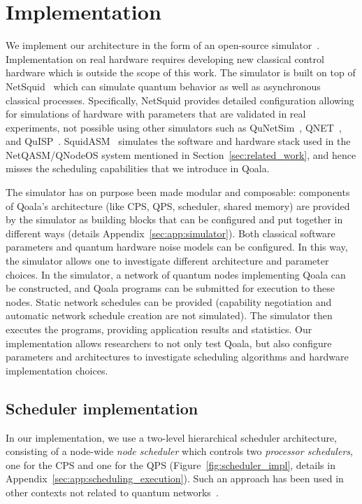 \section{Implementation}
\label{sec:implementation}
We implement our architecture in the form of an open-source simulator~\cite{qoala2023simulator}.
Implementation on real hardware requires developing new classical control hardware which is outside the scope of this work.
The simulator is built on top of NetSquid~\cite{coopmans2021netsquid} which can simulate quantum behavior as well as asynchronous classical processes.
Specifically, NetSquid provides detailed configuration allowing for simulations of hardware with parameters that are validated in real experiments, not possible using other simulators such as QuNetSim~\cite{diadamo2021qunetsim}, QNET~\cite{QNET}, and QuISP~\cite{satoh2022quisp}.
SquidASM~\cite{squidasmrepo} simulates the software and hardware stack used in the NetQASM/QNodeOS system mentioned in Section~\ref{sec:related_work}, and hence misses the scheduling capabilities that we introduce in Qoala.

The simulator has on purpose been made modular and composable:
components of Qoala's architecture (like CPS, QPS, scheduler, shared memory) are provided by the simulator as building blocks that can be configured and put together in different ways (details Appendix~\ref{sec:app:simulator}).
Both classical software parameters and quantum hardware noise models can be configured.
In this way, the simulator allows one to investigate different architecture and parameter choices.
In the simulator, a network of quantum nodes implementing Qoala can be constructed, and Qoala programs can be submitted for execution to these nodes.
Static network schedules can be provided (capability negotiation and automatic network schedule creation are not simulated).
The simulator then executes the programs, providing application results and statistics.
Our implementation allows researchers to not only test Qoala, but also configure parameters and architectures to investigate scheduling algorithms and hardware implementation choices.

\subsection{Scheduler implementation}
In our implementation, we use a two-level hierarchical scheduler architecture,
consisting of a node-wide \textit{node scheduler} which controls two \textit{processor schedulers}, one for the CPS and one for the QPS (Figure~\ref{fig:scheduler_impl}, details in Appendix~\ref{sec:app:scheduling_execution}).
Such an approach has been used in other contexts not related to quantum networks~\cite{polychronopoulos1991hierarchical, girkar1994hierarchical}.

